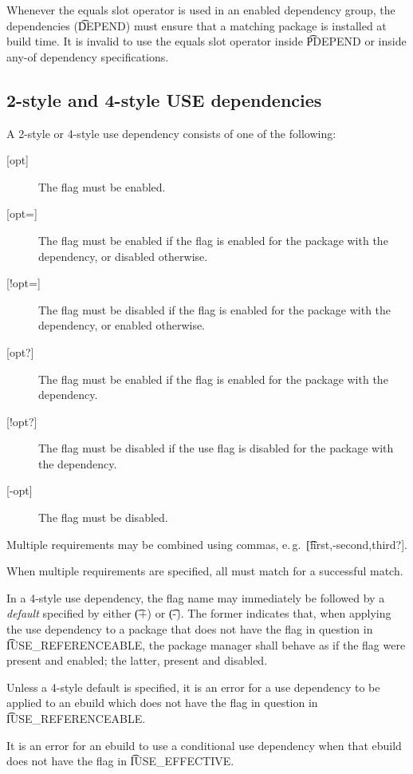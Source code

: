 Whenever the equals slot operator is used in an enabled dependency group, the dependencies
(\t{DEPEND}) must ensure that a matching package is installed at build time. It is invalid to use
the equals slot operator inside \t{PDEPEND} or inside any-of dependency specifications.

\subsection{2-style and 4-style USE dependencies}
\label{sec:use-dep}

A 2-style or 4-style use dependency consists of one of the following:
\nobreakpar
\begin{description}
\item[{[opt]}] The flag must be enabled.
\item[{[opt=]}] The flag must be enabled if the flag is enabled for the package with the
    dependency, or disabled otherwise.
\item[{[!opt=]}] The flag must be disabled if the flag is enabled for the package with the
    dependency, or enabled otherwise.
\item[{[opt?]}] The flag must be enabled if the flag is enabled for the package with the
    dependency.
\item[{[!opt?]}] The flag must be disabled if the use flag is disabled for the package with the
    dependency.
\item[{[-opt]}] The flag must be disabled.
\end{description}

Multiple requirements may be combined using commas, e.\,g.\ \t{[first,-second,third?]}.

When multiple requirements are specified, all must match for a successful match.

 In a 4-style use dependency, the flag name may immediately be
followed by a \emph{default} specified by either \t{(+)} or \t{(-)}. The former indicates that,
when applying the use dependency to a package that does not have the flag in question in
\t{IUSE_REFERENCEABLE}, the package manager shall behave as if the flag were present and enabled;
the latter, present and disabled.

Unless a 4-style default is specified, it is an error for a use dependency to be applied to an
ebuild which does not have the flag in question in \t{IUSE_REFERENCEABLE}.


It is an error for an ebuild to use a conditional use dependency when that ebuild does not have the
flag in \t{IUSE_EFFECTIVE}.


